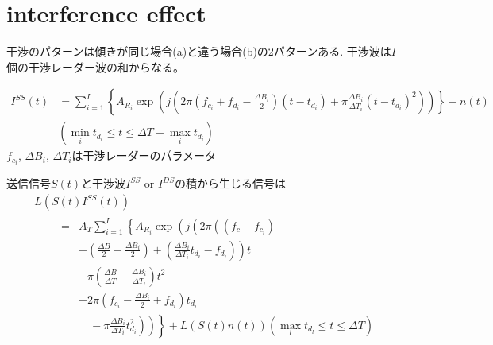 \section{interference effect}
干渉のパターンは傾きが同じ場合(a)と違う場合(b)の2パターンある.
干渉波は$I$個の干渉レーダー波の和からなる。

\begin{align}    
    I^{S S}(t) &= \sum_{i=1}^{I}\left\{A_{R_{i}} \exp \left(j\left(2 \pi\left(f_{c_{i}}+f_{d_{i}}-\frac{\Delta B_{i}}{2}\right)\left(t-t_{d_{i}}\right)+\pi \frac{\Delta B_{i}}{\Delta T_{i}}\left(t-t_{d_{i}}\right)^{2}\right)\right)\right\}+n(t) \\ & \left(\min _{i} t_{d_{i}} \leq t \leq \Delta T+\max _{i} t_{d_{i}}\right) 
\end{align}
$f_{c_i}$, $\Delta B_i$, $\Delta T_i$は干渉レーダーのパラメータ

送信信号$S(t)$と干渉波$I^{S S}$ or $I^{D S}$の積から生じる信号は
\begin{equation}
    \begin{array}{l}
    L\left(S(t) I^{S S}(t)\right) \\
    \qquad \begin{aligned}
    =& A_{T} \sum_{i=1}^{I}\left\{A _ { R _ { i } } \operatorname { e x p } \left(j \left(2 \pi \left(\left(f_{c}-f_{c_{i}}\right)\right.\right.\right.\right.\\
    &\left.-\left(\frac{\Delta B}{2}-\frac{\Delta B_{i}}{2}\right)+\left(\frac{\Delta B_{i}}{\Delta T_{i}} t_{d_{i}}-f_{d_{i}}\right)\right) t \\
    &+\pi\left(\frac{\Delta B}{\Delta T}-\frac{\Delta B_{i}}{\Delta T_{i}}\right) t^{2} \\
    &+2 \pi\left(f_{c_{i}}-\frac{\Delta B_{i}}{2}+f_{d_{i}}\right) t_{d_{i}} \\
    &\left.\left.\left.\quad-\pi \frac{\Delta B_{i}}{\Delta T_{i}} t_{d_{i}}^{2}\right)\right)\right\}+L(S(t) n(t))\left(\max _{l} t_{d_{l}} \leq t \leq \Delta T\right)
    \end{aligned}
    \end{array}
\end{equation}

